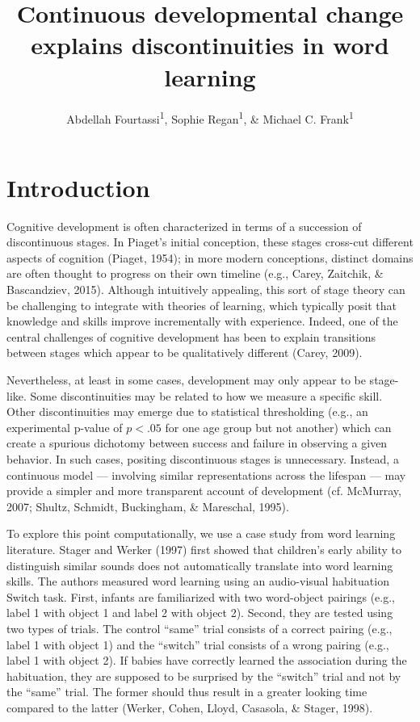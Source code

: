 \documentclass[english,,man]{apa6}
\title{Continuous developmental change explains discontinuities in word
learning}
\author{Abdellah Fourtassi\textsuperscript{1}, Sophie Regan\textsuperscript{1},
\& Michael C. Frank\textsuperscript{1}}
\date{}
\affiliation{
\vspace{0.5cm}
\textsuperscript{1} Department of Psychology, Stanford University}
\theoremstyle{definition}
\theoremstyle{definition}
\theoremstyle{definition}
\theoremstyle{remark}
\begin{document}
\maketitle

\section{Introduction}\label{introduction}

Cognitive development is often characterized in terms of a succession of
discontinuous stages. In Piaget's initial conception, these stages
cross-cut different aspects of cognition (Piaget, 1954); in more modern
conceptions, distinct domains are often thought to progress on their own
timeline (e.g., Carey, Zaitchik, \& Bascandziev, 2015). Although
intuitively appealing, this sort of stage theory can be challenging to
integrate with theories of learning, which typically posit that
knowledge and skills improve incrementally with experience. Indeed, one
of the central challenges of cognitive development has been to explain
transitions between stages which appear to be qualitatively different
(Carey, 2009).

Nevertheless, at least in some cases, development may only appear to be
stage-like. Some discontinuities may be related to how we measure a
specific skill. Other discontinuities may emerge due to statistical
thresholding (e.g., an experimental p-value of \(p < .05\) for one age
group but not another) which can create a spurious dichotomy between
success and failure in observing a given behavior. In such cases,
positing discontinuous stages is unnecessary. Instead, a continuous
model --- involving similar representations across the lifespan --- may
provide a simpler and more transparent account of development (cf.
McMurray, 2007; Shultz, Schmidt, Buckingham, \& Mareschal, 1995).

To explore this point computationally, we use a case study from word
learning literature. Stager and Werker (1997) first showed that
children's early ability to distinguish similar sounds does not
automatically translate into word learning skills. The authors measured
word learning using an audio-visual habituation Switch task. First,
infants are familiarized with two word-object pairings (e.g., label 1
with object 1 and label 2 with object 2). Second, they are tested using
two types of trials. The control \enquote{same} trial consists of a
correct pairing (e.g., label 1 with object 1) and the \enquote{switch}
trial consists of a wrong pairing (e.g., label 1 with object 2). If
babies have correctly learned the association during the habituation,
they are supposed to be surprised by the \enquote{switch} trial and not
by the \enquote{same} trial. The former should thus result in a greater
looking time compared to the latter (Werker, Cohen, Lloyd, Casasola, \&
Stager, 1998).
\end{document}
